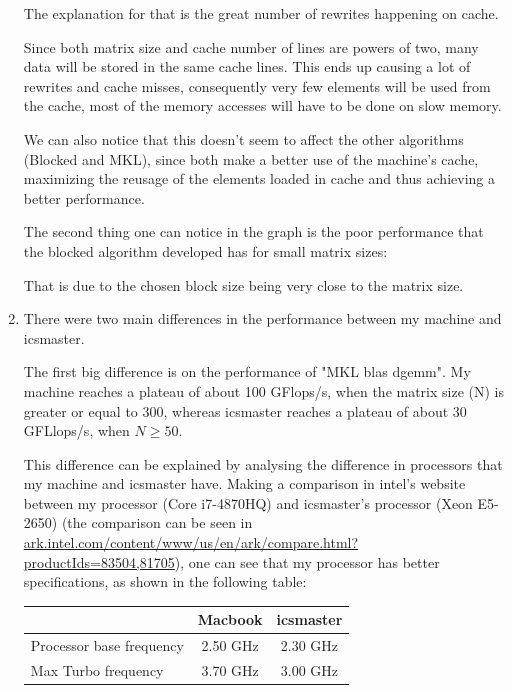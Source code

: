 \documentclass[unicode,11pt,a4paper,oneside,numbers=endperiod,openany]{scrartcl}
\begin{document}
\begin{enumerate}
            The explanation for that is the great number of rewrites happening on cache. 

            Since both matrix size and cache number of lines are powers of two, many data will be stored in the same cache lines. 
            This ends up causing a lot of rewrites and cache misses, consequently very few elements will be used from the cache, most of the memory accesses will have to be done on slow memory.

            We can also notice that this doesn't seem to affect the other algorithms (Blocked and MKL), since both make a better use of the machine's cache, maximizing the reusage of the elements loaded in cache and thus achieving a better performance.

            The second thing one can notice in the graph is the poor performance that the blocked algorithm developed has for small matrix sizes:

            That is due to the chosen block size being very close to the matrix size.
            
        \item %
            There were two main differences in the performance between my machine and icsmaster.

            The first big difference is on the performance of "MKL blas dgemm".
            My machine reaches a plateau of about 100 GFlops/s, when the matrix size (N) is greater or equal to 300, whereas icsmaster reaches a plateau of about 30 GFLlops/s, when $N \geq 50$.

            This difference can be explained by analysing the difference in processors that my machine and icsmaster have.
            \sloppy Making a comparison in intel's website between my processor (Core i7-4870HQ) and icsmaster's processor (Xeon E5-2650) (the comparison can be seen in \href{https://ark.intel.com/content/www/us/en/ark/compare.html?productIds=83504,81705}{ark.intel.com/content/www/us/en/ark/compare.html?productIds=83504,81705}), one can see that my processor has better specifications, as shown in the following table:

            \begin{center}
                \begin{tabular}{| l || c | c |}
                        \hline
                    & \textbf{Macbook} & \textbf{icsmaster} \\
                    \hline
                    Processor base frequency & 2.50 GHz  & 2.30 GHz \\ 
                    \hline
                    Max Turbo frequency & 3.70 GHz & 3.00 GHz \\
                    \hline
                \end{tabular}
            \end{center}


\end{enumerate}
\end{document}
